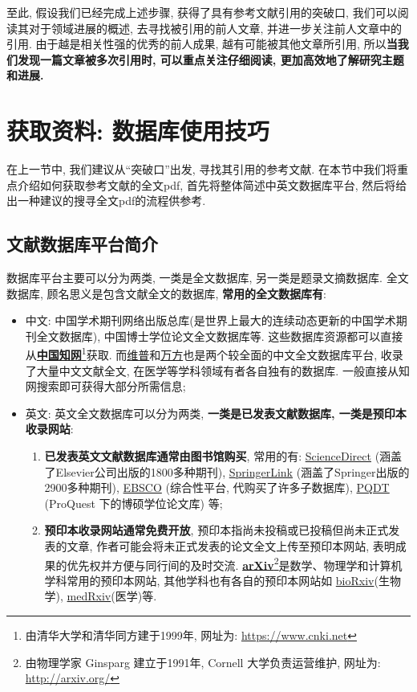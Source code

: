 \documentclass{formatBook}
\begin{document}
至此, 假设我们已经完成上述步骤, 获得了具有参考文献引用的突破口, 我们可以阅读其对于领域进展的概述, 去寻找被引用的前人文章, 并进一步关注前人文章中的引用. 由于越是相关性强的优秀的前人成果, 越有可能被其他文章所引用, 所以\textbf{当我们发现一篇文章被多次引用时, 可以重点关注仔细阅读, 更加高效地了解研究主题和进展.}

\section{获取资料: 数据库使用技巧}
在上一节中, 我们建议从``突破口''出发, 寻找其引用的参考文献. 在本节中我们将重点介绍如何获取参考文献的全文pdf, 首先将整体简述中英文数据库平台, 然后将给出一种建议的搜寻全文pdf的流程供参考.

\subsection{文献数据库平台简介}
数据库平台主要可以分为两类, 一类是全文数据库, 另一类是题录文摘数据库. 全文数据库, 顾名思义是包含文献全文的数据库, \textbf{常用的全文数据库有}:
\begin{itemize}
    \item 中文: 中国学术期刊网络出版总库(是世界上最大的连续动态更新的中国学术期刊全文数据库), 中国博士学位论文全文数据库等. 这些数据库资源都可以直接从\textbf{\href{https://www.cnki.net/}{中国知网}}\footnote{由清华大学和清华同方建于1999年, 网址为: \url{https://www.cnki.net}}获取. 而\href{http://www.cqvip.com/}{维普}和\href{https://new.wanfangdata.com.cn/index.html}{万方}也是两个较全面的中文全文数据库平台, 收录了大量中文文献全文, 在医学等学科领域有者各自独有的数据库. 一般直接从知网搜索即可获得大部分所需信息;
    \item 英文: 英文全文数据库可以分为两类, \textbf{一类是已发表文献数据库, 一类是预印本收录网站}:
          \begin{enumerate}
              \item \textbf{已发表英文文献数据库通常由图书馆购买}, 常用的有: \href{https://www.sciencedirect.com/}{ScienceDirect} (涵盖了Elsevier公司出版的1800多种期刊), \href{https://link.springer.com/}{SpringerLink} (涵盖了Springer出版的2900多种期刊), \href{https://www.ebsco.com}{EBSCO} (综合性平台, 代购买了许多子数据库), \href{http://www.pqdtcn.com/}{PQDT}
                    (ProQuest 下的博硕学位论文库) 等;
              \item \textbf{预印本收录网站通常免费开放}, 预印本指尚未投稿或已投稿但尚未正式发表的文章, 作者可能会将未正式发表的论文全文上传至预印本网站, 表明成果的优先权并方便与同行间的及时交流. \textbf{\href{http://arxiv.org/}{arXiv}}\footnote{由物理学家 Ginsparg 建立于1991年, Cornell 大学负责运营维护, 网址为: \url{http://arxiv.org/}}是数学、物理学和计算机学科常用的预印本网站, 其他学科也有各自的预印本网站如 \href{https://www.biorxiv.org/}{bioRxiv}(生物学), \href{https://www.medrxiv.org/}{medRxiv}(医学)等.
          \end{enumerate}
\end{itemize}
\end{document}
